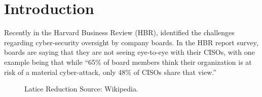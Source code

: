 \section{Introduction}

Recently in the Harvard Business Review (HBR), \textcite{Coppersmith1997} identified the challenges regarding cyber-security oversight by company
boards.   In the HBR report survey, boards are saying that they are not seeing eye-to-eye with their CISOs, with one example being that while
\enquote{65\% of board members think their organization is at risk of a material cyber-attack, only 48\% of CISOs share that view.}

\begin{figure}[!ht] %
  \hfill
  \caption{Latice Reduction \autocite{Wikipedia:2021}  Source: Wikipedia.}
  \label{fig:lattice-reduction}
\end{figure}

